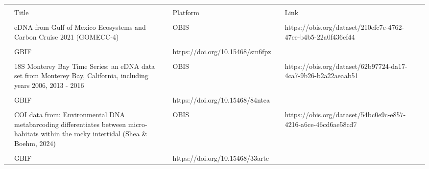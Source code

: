 \documentclass[
  letterpaper,
  DIV=11,
  numbers=noendperiod]{scrartcl}
\begin{document}
\begin{tcolorbox}[enhanced jigsaw, left=2mm, arc=.35mm, bottomrule=.15mm, breakable, toprule=.15mm, colbacktitle=quarto-callout-tip-color!10!white, opacitybacktitle=0.6, colframe=quarto-callout-tip-color-frame, leftrule=.75mm, title=\textcolor{quarto-callout-tip-color}{\faLightbulb}\hspace{0.5em}{Example DNA-Derived Datasets}, bottomtitle=1mm, toptitle=1mm, titlerule=0mm, coltitle=black, rightrule=.15mm, opacityback=0, colback=white]

\begin{longtable}[]{@{}
  >{\raggedright\arraybackslash}p{}
  >{\raggedright\arraybackslash}p{}
  >{\raggedright\arraybackslash}p{}
  >{\raggedright\arraybackslash}p{}
  >{\raggedright\arraybackslash}p{}
  >{\raggedright\arraybackslash}p{}
  >{\raggedright\arraybackslash}p{}@{}}
\toprule\noalign{}
\endhead
\bottomrule\noalign{}
\endlastfoot
& & & & & & \\
& Title & & Platform & & Link & \\
& & & & & & \\
& eDNA from Gulf of Mexico Ecosystems and Carbon Cruise 2021 (GOMECC-4)
& & OBIS & &
https://obis.org/dataset/210efc7c-4762-47ee-b4b5-22a0f436ef44 & \\
& & & & & & \\
& GBIF & & https://doi.org/10.15468/sm6fpz & & & \\
& & & & & & \\
& 18S Monterey Bay Time Series: an eDNA data set from Monterey Bay,
California, including years 2006, 2013 - 2016 & & OBIS & &
https://obis.org/dataset/62b97724-da17-4ca7-9b26-b2a22aeaab51 & \\
& & & & & & \\
& GBIF & & https://doi.org/10.15468/84ntea & & & \\
& & & & & & \\
& COI data from: Environmental DNA metabarcoding differentiates between
micro-habitats within the rocky intertidal (Shea \& Boehm, 2024) & &
OBIS & & https://obis.org/dataset/54bc0e9c-e857-4216-a6ce-46cd6ae58cd7
& \\
& & & & & & \\
& GBIF & & https://doi.org/10.15468/33artc & & & \\

\end{longtable}
\end{tcolorbox}
\end{document}
